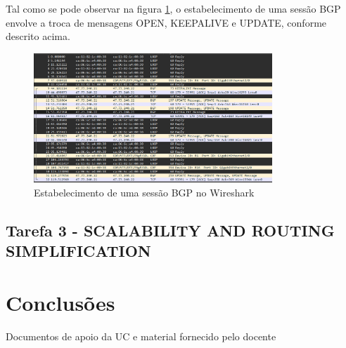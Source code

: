\documentclass[11pt,english, openright, oneside]{book}
\begin{document}
\begin{enumerate}
  Tal como se pode observar na figura \ref{fig:wireshark}, o estabelecimento de uma sessão BGP envolve a troca de mensagens OPEN, KEEPALIVE e UPDATE, conforme descrito acima.
  \vspace{0.2cm}

  \begin{figure}[H]
    \centering
    \includegraphics[width=0.80\textwidth]{imagens/Tarefa2/8.wireshark.png}
    \caption{Estabelecimento de uma sessão BGP no Wireshark}
    \label{fig:wireshark}
  \end{figure}

\end{enumerate}
\pagebreak

\section{Tarefa 3 - SCALABILITY AND ROUTING SIMPLIFICATION}
\vspace{0.2cm}

\chapter{Conclusões}
\vspace{0.2cm}


\pagebreak

\begin{thebibliography}{4} %
   Documentos de apoio da UC e material fornecido pelo docente
\end{thebibliography}

\mainmatter
\end{document}
